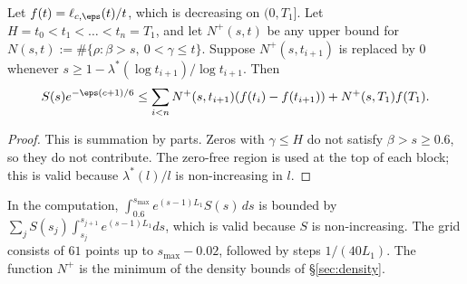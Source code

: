 \begin{lemma}\label{lem:stieltjes}
Let $f(t) = \ell_{c,\eps}(t)/t$, which is decreasing on $(0, T_1]$.
Let $H = t_0 < t_1 < \dots < t_n = T_1$, and let $N^+(s,t)$ be any upper bound for $N(s,t) := \#\{\rho: \beta > s,\ 0<\gamma\le t\}$.
Suppose $N^+(s,t_{i+1})$ is replaced by $0$ whenever $s \ge 1 - \lambda^*(\log t_{i+1})/\log t_{i+1}$. Then
\[
S(s)e^{-\eps(c+1)/6} \le \sum_{i<n} N^+(s, t_{i+1})(f(t_i) - f(t_{i+1})) + N^+(s, T_1)f(T_1).
\]
\end{lemma}

\begin{proof}
This is summation by parts.
Zeros with $\gamma \le H$ do not satisfy $\beta > s \ge 0.6$, so they do not contribute.
The zero-free region is used at the top of each block; this is valid because $\lambda^*(l)/l$ is non-increasing in $l$.
\end{proof}

In the computation, $\int_{0.6}^{s_{\max}}e^{(s-1)L_1}S(s)\,ds$ is bounded by $\sum_j S(s_j)\int_{s_j}^{s_{j+1}}e^{(s-1)L_1}ds$, which is valid because $S$ is non-increasing.
The grid consists of $61$ points up to $s_{\max} - 0.02$, followed by steps $1/(40L_1)$.
The function $N^+$ is the minimum of the density bounds of \S\ref{sec:density}.
